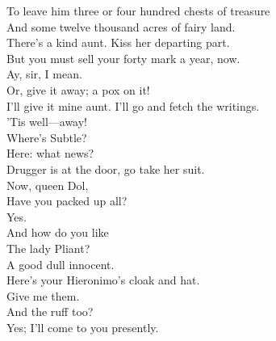 \documentclass[a4paper,oneside,12pt]{memoir}
\begin{document}
\begin{drama*}
To leave him three or four hundred chests of treasure\\
And some twelve thousand acres of fairy land.\\
\subtlespeaks There's a kind aunt. Kiss her departing part.\\
But you must sell your forty mark a year, now.\\
\dapperspeaks Ay, sir, I mean.\\
\subtlespeaks {} Or, give it away; a pox on it!\\
\dapperspeaks I'll give it mine aunt. I'll go and fetch the writings.\\
\subtlespeaks 'Tis well---away!\\
\facespeaks {} Where's Subtle?\\
\subtlespeaks {} Here: what news?\\
\facespeaks Drugger is at the door, go take her suit.\\
 Now, queen Dol,\\
Have you packed up all?\\
\dolspeaks {} Yes.\\
\facespeaks {} And how do you like\\
The lady Pliant?\\
\dolspeaks {} A good dull innocent.\\
\subtlespeaks Here's your Hieronimo's cloak and hat.\\
\facespeaks {} Give me them.\\
\subtlespeaks And the ruff too?\\
\facespeaks {} Yes; I'll come to you presently.\\

\scene


\end{drama*}
\end{document}
